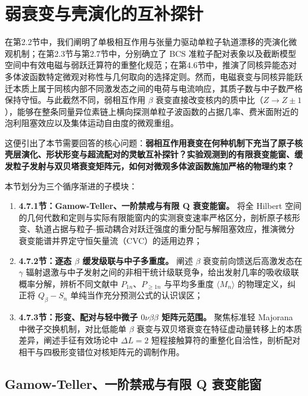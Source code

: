 \section{弱衰变与壳演化的互补探针}\label{sec:4-7}

在第2.2节中，我们阐明了单极相互作用与张量力驱动单粒子轨道漂移的壳演化微观机制；在第2.3节与第2.7节中，分别确立了 BCS 准粒子配对表象以及截断模型空间中有效电磁与弱跃迁算符的重整化规范；在第4.6节中，推演了同核异能态对多体波函数特定微观对称性与几何取向的选择定则。然而，电磁衰变与同核异能跃迁本质上属于同核内部不同激发态之间的电荷与电流响应，其质子数与中子数严格保持守恒。与此截然不同，弱相互作用 $\beta$ 衰变直接改变核内的质中比（$Z \to Z \pm 1$），能够在整条同量异位素链上横向探测单粒子波函数的占据几率、费米面附近的泡利阻塞效应以及集体运动自由度的微观重组。

这便引出了本节需要回答的核心问题：\textbf{弱相互作用衰变在何种机制下充当了原子核壳层演化、形状形变与超流配对的灵敏互补探针？实验观测到的有限衰变能窗、缓发粒子发射与双贝塔衰变矩阵元，如何对微观多体波函数施加严格的物理约束？}

本节划分为三个循序渐进的子模块：
\begin{enumerate}
\item \textbf{4.7.1节：Gamow-Teller、一阶禁戒与有限 Q 衰变能窗。} 将全 Hilbert 空间的几何代数和定则与实际有限能窗内的实测衰变速率严格区分，剖析原子核形变、轨道占据与粒子-振动耦合对跃迁强度的重分配与解阻塞效应，推演微分衰变能谱并界定守恒矢量流（CVC）的适用边界；
\item \textbf{4.7.2节：逐态 $\beta$ 缓发级联与中子多重度。} 阐述 $\beta$ 衰变前向馈送后高激发态在 $\gamma$ 辐射退激与中子发射之间的非相干统计级联竞争，给出发射几率的吸收级联概率分解，辨析不同文献中 $P_{1n}$、$P_{\ge 1n}$ 与平均多重度 $\langle M_n \rangle$ 的物理定义，纠正将 $Q_\beta - S_n$ 单纯当作充分预测公式的认识误区；
\item \textbf{4.7.3节：形变、配对与轻中微子 $0\nu\beta\beta$ 矩阵元范围。} 聚焦标准轻 Majorana 中微子交换机制，对比低能单 $\beta$ 衰变与双贝塔衰变在特征虚动量转移上的本质差异，阐述手征有效场论中 $\Delta L = 2$ 短程接触算符的重整化自洽性，剖析配对相干与四极形变错位对核矩阵元的调制作用。
\end{enumerate}

\subsection{Gamow-Teller、一阶禁戒与有限 Q 衰变能窗}\label{sec:4-7-1}

